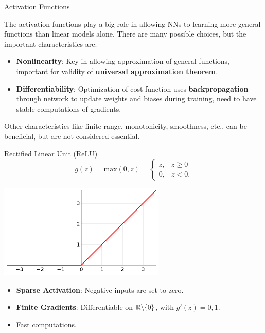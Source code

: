 \documentclass[12pt,t]{beamer}
\begin{document}
\begin{frame}{Activation Functions}

The activation functions  play a big role in allowing NNs to learning more general functions than linear models alone.  There are many possible choices, but the important characteristics are:
\begin{itemize}
\item {\bf Nonlinearity}: Key in allowing approximation of general functions, important for validity of {\bf universal approximation theorem}.
\item {\bf Differentiability}: Optimization of cost function uses {\bf backpropagation} through network to update weights and biases during training, need to have stable computations of gradients. 
\end{itemize}
Other characteristics like finite range, monotonicity, smoothness, etc., can be beneficial, but are not considered essential.  

\end{frame}

\begin{frame}{Rectified Linear Unit (ReLU)}
$$ g(z) = \text{max}(0,z) = \begin{cases} z, & z \geq 0 \\ 0, & z < 0. \end{cases}$$

\centerline{
\includegraphics[height=0.35\textheight]{./images/relu.png}
}

\begin{itemize}
\item {\bf Sparse Activation}: Negative inputs are set to zero.
\item {\bf Finite Gradients}: Differentiable on $\mathbb{R} {\char`\\} \{0\}$, with $g'(z) = 0, 1$.
\item Fast computations.
\end{itemize}

\end{frame}
\end{document}
